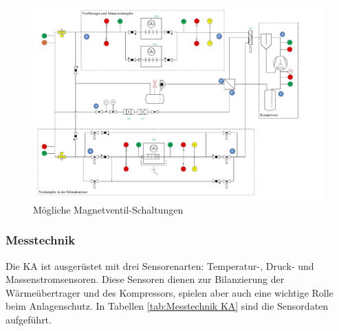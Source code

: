 \begin{figure}%
\centering		
\hspace{2cm}\includegraphics[page={3},width=1.15\textwidth]{Pictures/Schaltschema.pdf}
\caption{Mögliche Magnetventil-Schaltungen}
\label{fig:Magnetventil}
\end{figure}

\subsubsection*{Messtechnik}
\label{subsubsec:Messtechnik}

Die KA ist ausgerüstet mit drei Sensorenarten: Temperatur-, Druck- und Massenstromsensoren. Diese Sensoren dienen zur Bilanzierung der Wärmeübertrager und des Kompressors, spielen aber auch eine wichtige Rolle beim Anlagenschutz. In Tabellen \ref{tab:Messtechnik KA} sind die Sensordaten aufgeführt. 



